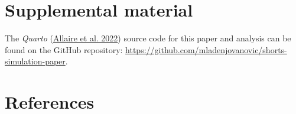 \documentclass[
  letterpaper,
  DIV=11,
  numbers=noendperiod]{scrartcl}
\begin{document}
\hypertarget{supplemental-material}{%
\section{Supplemental material}\label{supplemental-material}}

The \emph{Quarto} (\protect\hyperlink{ref-Allaire_Quarto_2022}{Allaire
et al. 2022}) source code for this paper and analysis can be found on
the GitHub repository:
\url{https://github.com/mladenjovanovic/shorts-simulation-paper}.

\hypertarget{references}{%
\section*{References}\label{references}}
\end{document}

